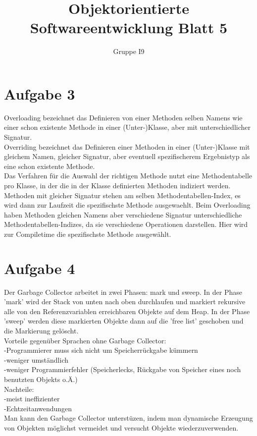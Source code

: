 \documentclass[]{article}
\title{Objektorientierte Softwareentwicklung Blatt 5}
\author{Gruppe I9}
\date{}
\begin{document}
\maketitle
\section*{Aufgabe 3}
Overloading bezeichnet das Definieren von einer Methoden selben Namens wie einer schon existente Methode  in einer (Unter-)Klasse, aber mit unterschiedlicher Signatur.\\
Overriding bezeichnet das Definieren einer Methoden in einer (Unter-)Klasse mit gleichem Namen, gleicher Signatur, aber eventuell spezifischerem Ergebnistyp als eine schon existente Methode.\\
Das Verfahren für die Auswahl der richtigen Methode nutzt eine Methodentabelle pro Klasse, in der die in der Klasse definierten Methoden indiziert werden. Methoden mit gleicher Signatur stehen am selben Methodentabellen-Index, es wird dann zur Laufzeit die spezifischste Methode ausgewaehlt. Beim Overloading haben Methoden gleichen Namens aber verschiedene Signatur unterschiedliche Methodentabellen-Indizes, da sie verschiedene Operationen darstellen. Hier wird zur Compiletime die spezifischste Methode ausgewählt.

\section*{Aufgabe 4}
Der Garbage Collector arbeitet in zwei Phasen: mark und sweep. In der Phase 'mark' wird der Stack von unten nach oben durchlaufen und markiert rekursive alle von den Referenzvariablen erreichbaren Objekte auf dem Heap. In der Phase 'sweep' werden diese markierten Objekte dann auf die 'free list' geschoben und die Markierung gelöscht.\\
Vorteile gegenüber Sprachen ohne Garbage Collector:\\
-Programmierer muss sich nicht um Speicherrückgabe kümmern\\
-weniger umständlich\\
-weniger Programmierfehler (Speicherlecks, Rückgabe von Speicher eines noch benutzten Objekts o.Ä.)\\
Nachteile:\\
-meist ineffizienter\\
-Echtzeitanwendungen\\

Man kann den Garbage Collector unterstüzen, indem man dynamische Erzeugung von Objekten möglichst vermeidet und versucht Objekte wiederzuverwenden.
\end{document}
